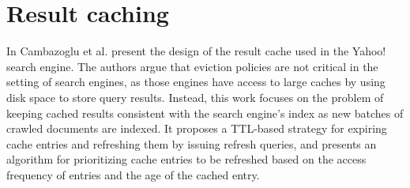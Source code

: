 

\section{Result caching}
\label{sec:related_caching}
In \cite{cambazoglu:yahoorefreshing} Cambazoglu et al. present the design of the result cache used
in the Yahoo! search engine.
The authors argue that eviction policies are not critical in the setting of search engines, as those engines have access
to large caches by using disk space to store query results.
Instead, this work focuses on the problem of keeping cached results consistent with the search engine’s index
as new batches of crawled documents are indexed.
It proposes a TTL-based strategy for expiring cache entries and refreshing them by issuing refresh queries,
and presents an algorithm for prioritizing cache entries to be refreshed based on the access frequency of entries and
the age of the cached entry.

